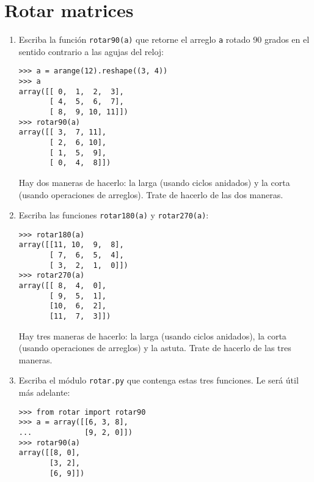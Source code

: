 \section{Rotar matrices}

\begin{enumerate}
\item
  Escriba la función \lstinline!rotar90(a)! que retorne el arreglo
  \lstinline!a! rotado 90 grados en el sentido contrario a las agujas
  del reloj:

\begin{lstlisting}
>>> a = arange(12).reshape((3, 4))
>>> a
array([[ 0,  1,  2,  3],
       [ 4,  5,  6,  7],
       [ 8,  9, 10, 11]])
>>> rotar90(a)
array([[ 3,  7, 11],
       [ 2,  6, 10],
       [ 1,  5,  9],
       [ 0,  4,  8]])
\end{lstlisting}

  Hay dos maneras de hacerlo: la larga (usando ciclos anidados) y la
  corta (usando operaciones de arreglos). Trate de hacerlo de las dos
  maneras.
\item
  Escriba las funciones \lstinline!rotar180(a)! y
  \lstinline!rotar270(a)!:

\begin{lstlisting}
>>> rotar180(a)
array([[11, 10,  9,  8],
       [ 7,  6,  5,  4],
       [ 3,  2,  1,  0]])
>>> rotar270(a)
array([[ 8,  4,  0],
       [ 9,  5,  1],
       [10,  6,  2],
       [11,  7,  3]])
\end{lstlisting}

  Hay tres maneras de hacerlo: la larga (usando ciclos anidados), la
  corta (usando operaciones de arreglos) y la astuta. Trate de hacerlo
  de las tres maneras.
\item
  Escriba el módulo \lstinline!rotar.py! que contenga estas tres
  funciones. Le será útil más adelante:

\begin{lstlisting}
>>> from rotar import rotar90
>>> a = array([[6, 3, 8],
...            [9, 2, 0]])
>>> rotar90(a)
array([[8, 0],
       [3, 2],
       [6, 9]])
\end{lstlisting}
\end{enumerate}
